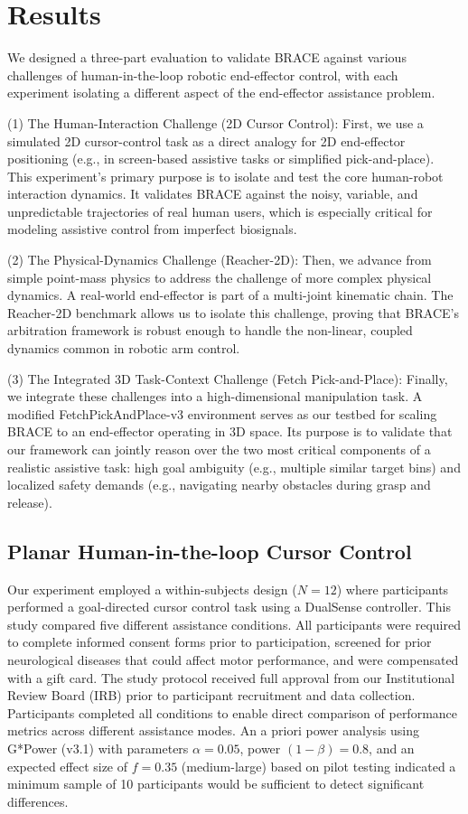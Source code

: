 \documentclass[11pt]{article}
\begin{document}
\section{Results}
\label{sec:experiments}


We designed a three-part evaluation to validate BRACE against various challenges of human-in-the-loop robotic end-effector control, with each experiment isolating a different aspect of the end-effector assistance problem.

(1) The Human-Interaction Challenge (2D Cursor Control): First, we use a simulated 2D cursor-control task as a direct analogy for 2D end-effector positioning (e.g., in screen-based assistive tasks or simplified pick-and-place). This experiment's primary purpose is to isolate and test the core human-robot interaction dynamics. It validates BRACE against the noisy, variable, and unpredictable trajectories of real human users, which is especially critical for modeling assistive control from imperfect biosignals.

(2) The Physical-Dynamics Challenge (Reacher-2D): Then, we advance from simple point-mass physics to address the challenge of more complex physical dynamics. A real-world end-effector is part of a multi-joint kinematic chain. The Reacher-2D benchmark allows us to isolate this challenge, proving that BRACE's arbitration framework is robust enough to handle the non-linear, coupled dynamics common in robotic arm control.

(3) The Integrated 3D Task-Context Challenge (Fetch Pick-and-Place): Finally, we integrate these challenges into a high-dimensional manipulation task. A modified FetchPickAndPlace-v3 environment serves as our testbed for scaling BRACE to an end-effector operating in 3D space. Its purpose is to validate that our framework can jointly reason over the two most critical components of a realistic assistive task: high goal ambiguity (e.g., multiple similar target bins) and localized safety demands (e.g., navigating nearby obstacles during grasp and release).

\subsection{Planar Human-in-the-loop Cursor Control}


Our experiment employed a within-subjects design ($N=12$) where participants performed a goal-directed cursor control task using a DualSense controller. This study compared five different assistance conditions. All participants were required to complete informed consent forms prior to participation, screened for prior neurological diseases that could affect motor performance, and were compensated with a gift card. The study protocol received full approval from our Institutional Review Board (IRB) prior to participant recruitment and data collection. Participants completed all conditions to enable direct comparison of performance metrics across different assistance modes. An a priori power analysis using G*Power (v3.1) with parameters $\alpha=0.05$, power $(1-\beta)=0.8$, and an expected effect size of $f=0.35$ (medium-large) based on pilot testing indicated a minimum sample of 10 participants would be sufficient to detect significant differences. 
\end{document}
